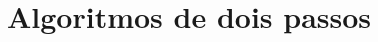 \documentclass[a4paper,12pt]{book}
\begin{document}
\chapter{Algoritmos de dois passos}

\end{document}
